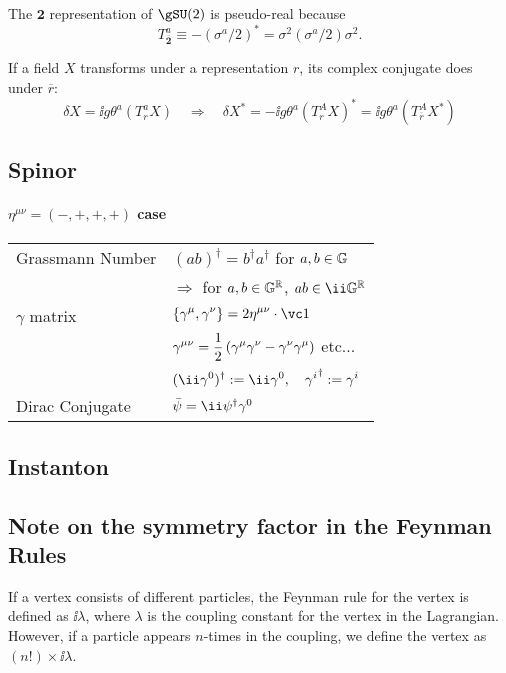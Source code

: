The $\boldsymbol2$ representation of $\gSU(2)$ is pseudo-real because
\begin{equation}
 T_{\overline {{\boldsymbol 2}}}^a \equiv -(\sigma^a/2)^* = \sigma^2(\sigma^a/2)\sigma^2.
\end{equation}

If a field $X$ transforms under a representation $r$, its complex conjugate does under $\overline r$:
\begin{equation}
  \delta X=\ii g\theta^a(T_r^a X)
\quad\Longrightarrow\quad
 \delta X^*
=-\ii g\theta^a(T_r^A X)^*
=\ii g\theta^a(T_{\overline r}^AX^*)
\end{equation}

\newpage







\subsection{Spinor}
\paragraph{$\eta^{\mu\nu}=(-,+,+,+)$ case}
\begin{tabular}[t]{l@{\ :\ }l}
 Grassmann Number
& $(ab)^\dagger=b^\dagger a^\dagger$ for $a,b\in\mathbb G$\\
& $\Longrightarrow$ for $a,b\in\mathbb G^\mathbb R$, $ab\in\ii\RealGrassmann$\\
 $\gamma$ matrix
& $\displaystyle\{\Gm,\Gn\}=2\minkow\mu\nu\cdot\vc1$\\
& $\displaystyle\G{\mu\nu} = \frac12\left(\Gm\Gn-\Gn\Gm\right)$
  \quad etc...\\
& $\displaystyle(\ii\G0)^\dagger:=\ii\G0,\quad\G i^\dagger:=\G i$\\
 Dirac Conjugate
& $\bar\psi=\ii\psi^\dagger\G0$
\end{tabular}

\subsection{Instanton}
\label{sec:cs-instanton}

\subsection{Note on the symmetry factor in the Feynman Rules}
\label{sec:note-symmetry-factor}
If a vertex consists of different particles, the Feynman rule for the vertex is defined as $\ii\lambda$, where $\lambda$ is the coupling constant for the vertex in the Lagrangian.
However, if a particle appears $n$-times in the coupling, we define the vertex as $(n!)\times\ii\lambda$.

